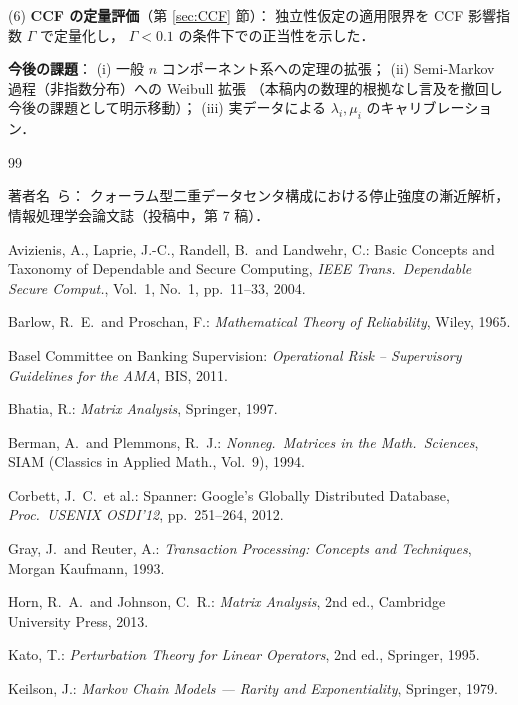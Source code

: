 \documentclass[12pt,a4paper]{article}
\theoremstyle{plain}
\theoremstyle{definition}
\theoremstyle{remark}
\begin{document}
(6) \textbf{CCF の定量評価}（第 \ref{sec:CCF} 節）：
独立性仮定の適用限界を CCF 影響指数 $\Gamma$ で定量化し，
$\Gamma<0.1$ の条件下での正当性を示した．

\textbf{今後の課題}：
(i) 一般 $n$ コンポーネント系への定理の拡張；
(ii) Semi-Markov 過程（非指数分布）への Weibull 拡張
（本稿内の数理的根拠なし言及を撤回し今後の課題として明示移動）；
(iii) 実データによる $\lambda_i,\mu_i$ のキャリブレーション．

\begin{thebibliography}{99}

  著者名~ら：
  クォーラム型二重データセンタ構成における停止強度の漸近解析，
  情報処理学会論文誌（投稿中，第 7 稿）．

  Avizienis, A., Laprie, J.-C., Randell, B.\ and Landwehr, C.:
  Basic Concepts and Taxonomy of Dependable and Secure Computing,
  \textit{IEEE Trans.\ Dependable Secure Comput.}, Vol.~1, No.~1, pp.~11--33, 2004.

  Barlow, R.~E.\ and Proschan, F.:
  \textit{Mathematical Theory of Reliability}, Wiley, 1965.

  Basel Committee on Banking Supervision:
  \textit{Operational Risk -- Supervisory Guidelines for the AMA},
  BIS, 2011.

  Bhatia, R.:
  \textit{Matrix Analysis}, Springer, 1997.

  Berman, A.\ and Plemmons, R.~J.:
  \textit{Nonneg.\ Matrices in the Math.\ Sciences},
  SIAM (Classics in Applied Math., Vol.~9), 1994.

  Corbett, J.~C.\ et al.:
  Spanner: Google's Globally Distributed Database,
  \textit{Proc.\ USENIX OSDI'12}, pp.~251--264, 2012.

  Gray, J.\ and Reuter, A.:
  \textit{Transaction Processing: Concepts and Techniques},
  Morgan Kaufmann, 1993.

  Horn, R.~A.\ and Johnson, C.~R.:
  \textit{Matrix Analysis}, 2nd ed., Cambridge University Press, 2013.

  Kato, T.:
  \textit{Perturbation Theory for Linear Operators}, 2nd ed., Springer, 1995.

  Keilson, J.:
  \textit{Markov Chain Models --- Rarity and Exponentiality}, Springer, 1979.


\end{thebibliography}
\end{document}
